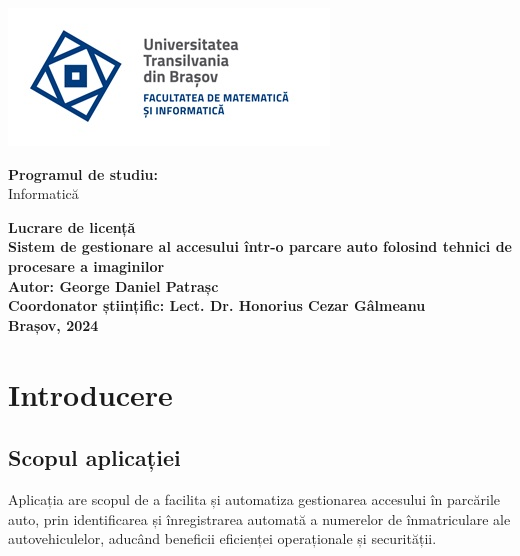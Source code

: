 \documentclass[a4paper,12pt]{report}
\begin{document}
\begin{titlepage}
    \begin{center}
        \begin{minipage}{8cm}
            \includegraphics[width=\linewidth]{images/unitbv.jpg}
        \end{minipage}
        \hfill
        \begin{minipage}{5cm}
            \textbf{Programul de studiu:}\\
            Informatică
        \end{minipage}
    \end{center}

    \vspace{3cm}

    \begin{center}
        \textbf{\LARGE Lucrare de licență}\\
        \vspace{0.5cm}
        \textbf{\Large Sistem de gestionare al accesului într-o parcare auto folosind tehnici de procesare a imaginilor}\\
        \vspace{2cm}
        \textbf{Autor: George Daniel Patrașc}\\
        \textbf{Coordonator științific: Lect. Dr. Honorius Cezar Gâlmeanu}\\
        \vspace{2cm}
        \textbf{Brașov, 2024}
    \end{center}
\end{titlepage}

\tableofcontents

\chapter{Introducere}
\section{Scopul aplicației}
Aplicația are scopul de a facilita și automatiza gestionarea accesului în parcările auto, prin identificarea și înregistrarea automată a numerelor de înmatriculare ale autovehiculelor, aducând beneficii eficienței operaționale și securității.
\end{document}
